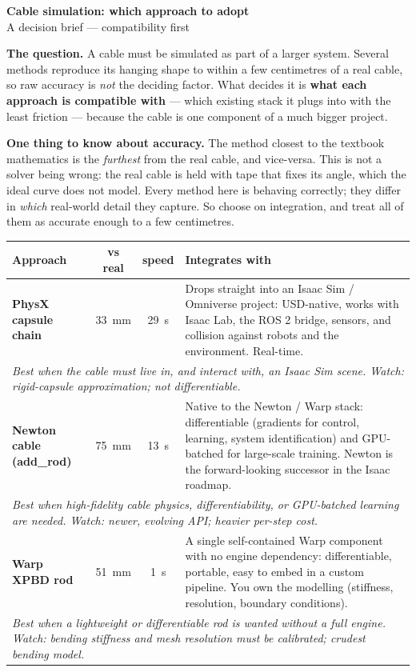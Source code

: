 \documentclass[11pt,a4paper]{article}
\begin{document}
\begin{center}
{\Large\bfseries Cable simulation: which approach to adopt}\\[2pt]
{\normalsize A decision brief --- compatibility first}
\end{center}

\textbf{The question.} A cable must be simulated as part of a larger system.
Several methods reproduce its hanging shape to within a few centimetres of a real
cable, so raw accuracy is \emph{not} the deciding factor. What decides it is
\textbf{what each approach is compatible with} --- which existing stack it plugs
into with the least friction --- because the cable is one component of a much
bigger project.

\textbf{One thing to know about accuracy.} The method closest to the textbook
mathematics is the \emph{furthest} from the real cable, and vice-versa. This is
not a solver being wrong: the real cable is held with tape that fixes its angle,
which the ideal curve does not model. Every method here is behaving correctly;
they differ in \emph{which} real-world detail they capture. So choose on
integration, and treat all of them as accurate enough to a few centimetres.

\vspace{4pt}
\renewcommand{\arraystretch}{1.25}
\begin{tabular}{@{}p{3.1cm} c c p{7.9cm}@{}}
\toprule
\textbf{Approach} & \textbf{vs real} & \textbf{speed} & \textbf{Integrates with} \\
\midrule
\textbf{PhysX capsule chain} & 33~mm & 29~s & Drops straight into an Isaac Sim / Omniverse project: USD-native, works with Isaac Lab, the ROS 2 bridge, sensors, and collision against robots and the environment. Real-time. \\[2pt]
\multicolumn{4}{p{\dimexpr\linewidth-2\tabcolsep}}{\footnotesize\itshape Best when the cable must live in, and interact with, an Isaac Sim scene. Watch: rigid-capsule approximation; not differentiable.} \\
\midrule
\textbf{Newton cable (add\_rod)} & 75~mm & 13~s & Native to the Newton / Warp stack: differentiable (gradients for control, learning, system identification) and GPU-batched for large-scale training. Newton is the forward-looking successor in the Isaac roadmap. \\[2pt]
\multicolumn{4}{p{\dimexpr\linewidth-2\tabcolsep}}{\footnotesize\itshape Best when high-fidelity cable physics, differentiability, or GPU-batched learning are needed. Watch: newer, evolving API; heavier per-step cost.} \\
\midrule
\textbf{Warp XPBD rod} & 51~mm & 1~s & A single self-contained Warp component with no engine dependency: differentiable, portable, easy to embed in a custom pipeline. You own the modelling (stiffness, resolution, boundary conditions). \\[2pt]
\multicolumn{4}{p{\dimexpr\linewidth-2\tabcolsep}}{\footnotesize\itshape Best when a lightweight or differentiable rod is wanted without a full engine. Watch: bending stiffness and mesh resolution must be calibrated; crudest bending model.} \\
\midrule
\bottomrule
\end{tabular}
\end{document}
